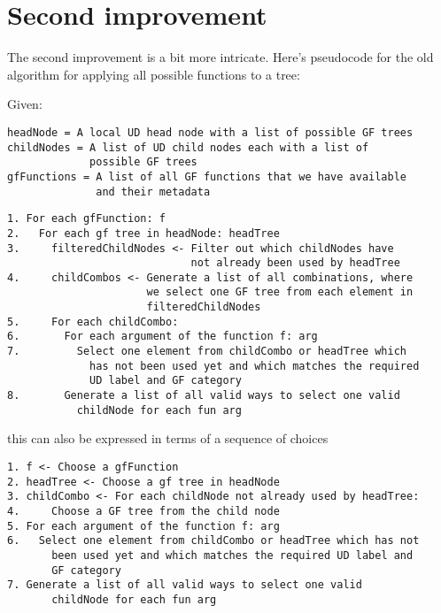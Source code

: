 
\section{Second improvement}

The second improvement is a bit more intricate. Here's pseudocode for the old algorithm for applying all possible functions to a tree:

Given:
\begin{verbatim}
headNode = A local UD head node with a list of possible GF trees
childNodes = A list of UD child nodes each with a list of
             possible GF trees
gfFunctions = A list of all GF functions that we have available
              and their metadata
\end{verbatim}



\begin{verbatim}
1. For each gfFunction: f
2.   For each gf tree in headNode: headTree
3.     filteredChildNodes <- Filter out which childNodes have
                             not already been used by headTree
4.     childCombos <- Generate a list of all combinations, where
                      we select one GF tree from each element in
                      filteredChildNodes
5.     For each childCombo:
6.       For each argument of the function f: arg
7.         Select one element from childCombo or headTree which
             has not been used yet and which matches the required
             UD label and GF category
8.       Generate a list of all valid ways to select one valid
           childNode for each fun arg
\end{verbatim}

this can also be expressed in terms of a sequence of choices

\begin{verbatim}
1. f <- Choose a gfFunction
2. headTree <- Choose a gf tree in headNode
3. childCombo <- For each childNode not already used by headTree:
4.     Choose a GF tree from the child node
5. For each argument of the function f: arg
6.   Select one element from childCombo or headTree which has not
       been used yet and which matches the required UD label and
       GF category
7. Generate a list of all valid ways to select one valid
       childNode for each fun arg
\end{verbatim}

